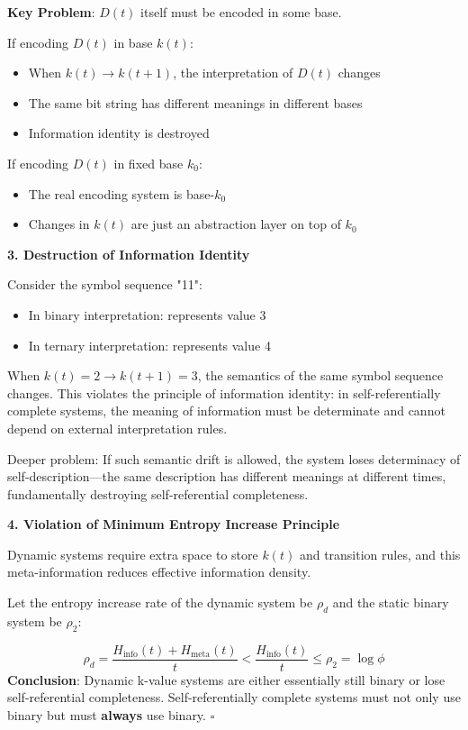 \textbf{Key Problem}: $D(t)$ itself must be encoded in some base.

If encoding $D(t)$ in base $k(t)$:
\begin{itemize}
\item When $k(t) \to k(t+1)$, the interpretation of $D(t)$ changes
\item The same bit string has different meanings in different bases
\item Information identity is destroyed
\end{itemize}

If encoding $D(t)$ in fixed base $k_0$:
\begin{itemize}
\item The real encoding system is base-$k_0$
\item Changes in $k(t)$ are just an abstraction layer on top of $k_0$
\end{itemize}

\textbf{3. Destruction of Information Identity}

Consider the symbol sequence "11":
\begin{itemize}
\item In binary interpretation: represents value 3
\item In ternary interpretation: represents value 4
\end{itemize}

When $k(t)=2 \to k(t+1)=3$, the semantics of the same symbol sequence changes. This violates the principle of information identity: in self-referentially complete systems, the meaning of information must be determinate and cannot depend on external interpretation rules.

Deeper problem: If such semantic drift is allowed, the system loses determinacy of self-description---the same description has different meanings at different times, fundamentally destroying self-referential completeness.

\textbf{4. Violation of Minimum Entropy Increase Principle}

Dynamic systems require extra space to store $k(t)$ and transition rules, and this meta-information reduces effective information density.

Let the entropy increase rate of the dynamic system be $\rho_d$ and the static binary system be $\rho_2$:

\begin{equation}
\rho_d = \frac{H_{\text{info}}(t) + H_{\text{meta}}(t)}{t} < \frac{H_{\text{info}}(t)}{t} \leq \rho_2 = \log \phi
\end{equation}
\textbf{Conclusion}: Dynamic k-value systems are either essentially still binary or lose self-referential completeness. Self-referentially complete systems must not only use binary but must \textbf{always} use binary. $\square$

